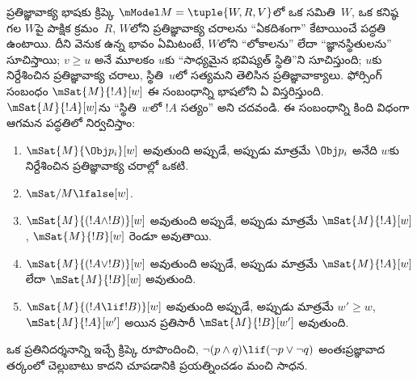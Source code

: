 \documentclass[../../../include/open-logic-section]{subfiles}
\begin{document}
ప్రతిజ్ఞావాక్య భాషకు క్రిప్కె 
$\mModel M = \tuple{W, R, V}$లో ఒక సమితి~$W$, ఒక కనిష్ఠ
 గల $W$పై పాక్షిక క్రమం~$R$, $W$లోని 
ప్రతిజ్ఞావాక్య చరాలను ``ఏకదిశంగా'' కేటాయించే
పద్ధతి ఉంటాయి.
దీని వెనుక ఉన్న భావం ఏమిటంటే, $W$లోని  ``లోకాలను'' లేదా
``జ్ఞానస్థితులను'' సూచిస్తాయి; $v \geq u$ అనే మూలకం $u$కు
``సాధ్యమైన భవిష్యత్ స్థితి''ని సూచిస్తుంది; $u$కు నిర్దేశించిన
ప్రతిజ్ఞావాక్య చరాలు, స్థితి~$u$లో సత్యమని తెలిసిన
ప్రతిజ్ఞావాక్యాలు. ఫోర్సింగ్ సంబంధం $\mSat{M}{!A}[w]$ ఈ సంబంధాన్ని
భాషలోని ఏ  విస్తరిస్తుంది. $\mSat{M}{!A}[w]$ను
``స్థితి~$w$లో $!A$ సత్యం'' అని చదవండి. ఈ సంబంధాన్ని కింది విధంగా
ఆగమన పద్ధతిలో నిర్వచిస్తాం:
\begin{enumerate}
\item $\mSat{M}{\Obj p_i}[w]$ అవుతుంది అప్పుడే, అప్పుడు మాత్రమే
  $\Obj p_i$ అనేది $w$కు నిర్దేశించిన ప్రతిజ్ఞావాక్య చరాల్లో ఒకటి.
\item $\mSat/{M}{\lfalse}[w]$.
\item $\mSat{M}{(!A \land !B)}[w]$ అవుతుంది అప్పుడే, అప్పుడు మాత్రమే
  $\mSat{M}{!A}[w]$, $\mSat{M}{!B}[w]$ రెండూ అవుతాయి.
\item $\mSat{M}{(!A \lor !B)}[w]$ అవుతుంది అప్పుడే, అప్పుడు మాత్రమే
  $\mSat{M}{!A}[w]$ లేదా $\mSat{M}{!B}[w]$ అవుతుంది.
\item $\mSat{M}{(!A \lif !B)}[w]$ అవుతుంది అప్పుడే, అప్పుడు మాత్రమే
  $w' \geq w$, $\mSat{M}{!A}[w']$ అయిన ప్రతిసారీ $\mSat{M}{!B}[w']$ అవుతుంది.
\end{enumerate}
ఒక ప్రతినిదర్శనాన్ని ఇచ్చే క్రిప్కె  రూపొందించి,
$\lnot (p \land q) \lif (\lnot p \lor \lnot q)$ అంతఃప్రజ్ఞావాద
తర్కంలో చెల్లుబాటు కాదని చూపడానికి ప్రయత్నించడం మంచి సాధన.
\end{document}
